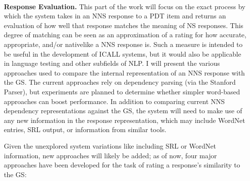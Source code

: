 \\
\textbf{Response Evaluation.} This part of the work will focus on the exact process by which the system takes in an NNS response to a PDT item and returns an evaluation of how well that response matches the meaning of NS responses. This degree of matching can be seen as an approximation of a rating for how accurate, appropriate, and/or nativelike a NNS response is. Such a measure is intended to be useful in the development of ICALL systems, but it would also be applicable in language testing and other subfields of NLP. I will present the various approaches used to compare the internal representation of an NNS response with the GS. The current approaches rely on dependency parsing (via the Stanford Parser), but experiments are planned to determine whether simpler word-based approaches can boost performance. In addition to comparing current NNS dependency representations against the GS, the system will need to make use of any new information in the response representation, which may include WordNet entries, SRL output, or information from similar tools.
\par
Given the unexplored system variations like including SRL or WordNet information, new approaches will likely be added; as of now, four major approaches have been developed for the task of rating a response's similarity to the GS:
